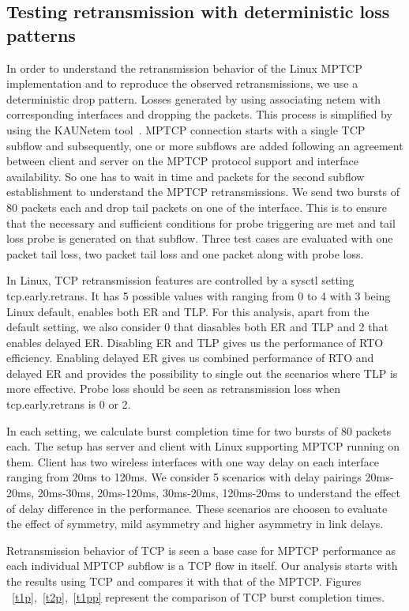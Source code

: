 \documentclass[10pt,draftcls,twocolumn]{IEEEconf}
\begin{document}
\subsection{Testing retransmission with deterministic loss patterns}
In order to understand the retransmission behavior of the Linux MPTCP implementation and to reproduce the observed retransmissions, we use a deterministic drop pattern.
Losses generated by using associating netem with corresponding interfaces and dropping the packets. This process is simplified by using the KAUNetem tool~\cite{Garcia2016}. 
MPTCP connection starts with a single TCP subflow and subsequently, one or more subflows are added following an agreement between client and server on the MPTCP protocol 
support and interface availability. So one has to wait in time and packets for the second subflow establishment to understand the MPTCP retransmissions. We send two bursts of 80 
packets each and drop tail packets on one of the interface. This is to ensure that the necessary and sufficient conditions for probe triggering are met and tail loss probe is generated on that
subflow. Three test cases are evaluated with one packet tail loss, two packet tail loss and  one packet along with probe loss. 

In Linux, TCP retransmission features are controlled by a sysctl setting tcp.early.retrans. It has 5 possible values with ranging from 0 to 4 with 3 being Linux default, enables both
ER and TLP. For this analysis, apart from the default setting, we also consider 0 that diasables both ER and TLP and 2 that enables delayed ER. Disabling ER and TLP gives us the performance
of RTO efficiency. Enabling delayed ER gives us combined performance of RTO and delayed ER and provides the possibility to single out the scenarios where TLP is more effective.
Probe loss should be seen as retransmission loss when tcp.early.retrans is 0 or 2.

In each setting, we calculate burst completion time for two bursts of 80 packets each. The setup has server and client with Linux supporting MPTCP running on them. Client has two wireless 
interfaces with one way delay on each interface ranging from 20ms to 120ms. We consider 5 scenarios with delay pairings 20ms-20ms, 20ms-30ms, 20ms-120ms, 30ms-20ms, 120ms-20ms to understand 
the effect of delay difference in the performance. These scenarios are choosen to evaluate the effect of symmetry, mild asymmetry and higher asymmetry in link delays. 


Retransmission behavior of TCP is seen a base case for MPTCP performance as each individual MPTCP subflow is a TCP flow in itself. Our analysis
starts with the results using TCP and compares it with that of the MPTCP. Figures ~\ref{t1p},~\ref{t2p},~\ref{t1pp} represent the comparison of TCP 
burst completion times.
\end{document}
